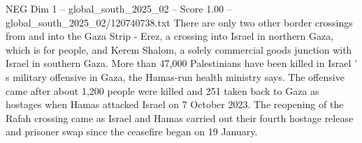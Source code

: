 \begin{textsample}{NEG Dim 1 – global\_south\_2025\_02 – Score 1.00 – global\_south\_2025\_02/120740738.txt}
There are only two other border crossings from and into the Gaza Strip - Erez, a crossing into Israel in northern Gaza, which is for people, and Kerem Shalom, a solely commercial goods junction with Israel in southern Gaza.
More than 47,000 Palestinians have been killed in Israel ' s military offensive in Gaza, the Hamas-run health ministry says.
The offensive came after about 1,200 people were killed and 251 taken back to Gaza as hostages when Hamas attacked Israel on 7 October 2023.
The reopening of the Rafah crossing came as Israel and Hamas carried out their fourth hostage release and prisoner swap since the ceasefire began on 19 January.

\end{textsample}
